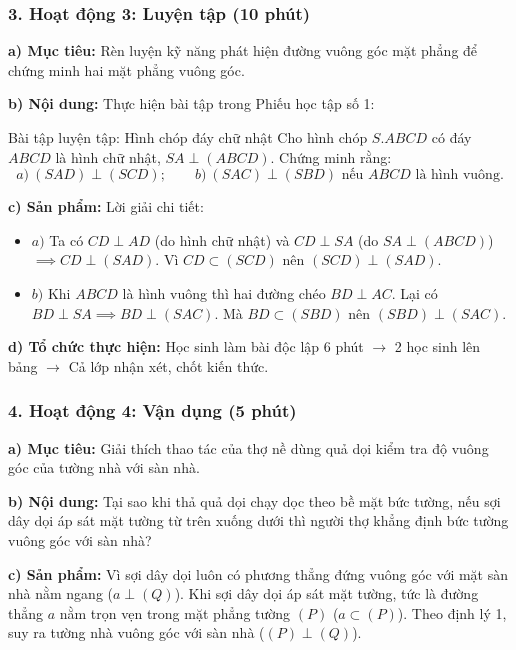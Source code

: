 \documentclass[12pt, a4paper]{article}
\begin{document}
\subsubsection*{3. Hoạt động 3: Luyện tập (10 phút)}

\noindent \textbf{a) Mục tiêu:}
Rèn luyện kỹ năng phát hiện đường vuông góc mặt phẳng để chứng minh hai mặt phẳng vuông góc.

\noindent \textbf{b) Nội dung:}
Thực hiện bài tập trong Phiếu học tập số 1:
\begin{pedabox}{Bài tập luyện tập: Hình chóp đáy chữ nhật}
Cho hình chóp $S.ABCD$ có đáy $ABCD$ là hình chữ nhật, $SA \perp (ABCD)$.
Chứng minh rằng:
$$a) \ (SAD) \perp (SCD); \qquad b) \ (SAC) \perp (SBD)\text{ nếu } ABCD\text{ là hình vuông}.$$
\end{pedabox}

\noindent \textbf{c) Sản phẩm:}
Lời giải chi tiết:
\begin{itemize}
    \item $a)$ Ta có $CD \perp AD$ (do hình chữ nhật) và $CD \perp SA$ (do $SA \perp (ABCD)$) $\implies CD \perp (SAD)$.
    Vì $CD \subset (SCD)$ nên $(SCD) \perp (SAD)$.
    \item $b)$ Khi $ABCD$ là hình vuông thì hai đường chéo $BD \perp AC$.
    Lại có $BD \perp SA \implies BD \perp (SAC)$. Mà $BD \subset (SBD)$ nên $(SBD) \perp (SAC)$.
\end{itemize}

\noindent \textbf{d) Tổ chức thực hiện:}
Học sinh làm bài độc lập 6 phút $\to$ 2 học sinh lên bảng $\to$ Cả lớp nhận xét, chốt kiến thức.

\subsubsection*{4. Hoạt động 4: Vận dụng (5 phút)}

\noindent \textbf{a) Mục tiêu:}
Giải thích thao tác của thợ nề dùng quả dọi kiểm tra độ vuông góc của tường nhà với sàn nhà.

\noindent \textbf{b) Nội dung:}
Tại sao khi thả quả dọi chạy dọc theo bề mặt bức tường, nếu sợi dây dọi áp sát mặt tường từ trên xuống dưới thì người thợ khẳng định bức tường vuông góc với sàn nhà?

\noindent \textbf{c) Sản phẩm:}
Vì sợi dây dọi luôn có phương thẳng đứng vuông góc với mặt sàn nhà nằm ngang ($a \perp (Q)$). Khi sợi dây dọi áp sát mặt tường, tức là đường thẳng $a$ nằm trọn vẹn trong mặt phẳng tường $(P)$ ($a \subset (P)$). Theo định lý 1, suy ra tường nhà vuông góc với sàn nhà ($(P) \perp (Q)$).
\end{document}
